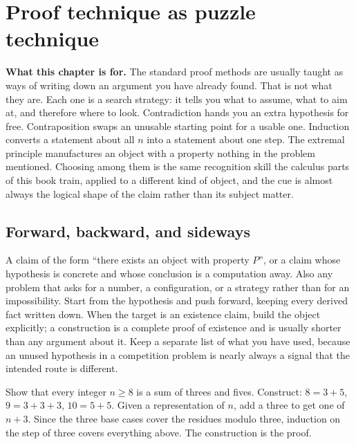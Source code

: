 \chapter{Proof technique as puzzle technique}

\begin{orient}
\textbf{What this chapter is for.} The standard proof methods are usually taught as ways of writing down an argument you have already found. That is not what they are. Each one is a search strategy: it tells you what to assume, what to aim at, and therefore where to look. Contradiction hands you an extra hypothesis for free. Contraposition swaps an unusable starting point for a usable one. Induction converts a statement about all $n$ into a statement about one step. The extremal principle manufactures an object with a property nothing in the problem mentioned. Choosing among them is the same recognition skill the calculus parts of this book train, applied to a different kind of object, and the cue is almost always the logical shape of the claim rather than its subject matter.
\end{orient}

\section{Forward, backward, and sideways}

\cue A claim of the form ``there exists an object with property $P$'', or a claim whose hypothesis is concrete and whose conclusion is a computation away. Also any problem that asks for a number, a configuration, or a strategy rather than for an impossibility.
\method Start from the hypothesis and push forward, keeping every derived fact written down. When the target is an existence claim, build the object explicitly; a construction is a complete proof of existence and is usually shorter than any argument about it. Keep a separate list of what you have used, because an unused hypothesis in a competition problem is nearly always a signal that the intended route is different.

\begin{worked}
Show that every integer $n\geq 8$ is a sum of threes and fives. Construct: $8=3+5$, $9=3+3+3$, $10=5+5$. Given a representation of $n$, add a three to get one of $n+3$. Since the three base cases cover the residues modulo three, induction on the step of three covers everything above. The construction is the proof.
\end{worked}

